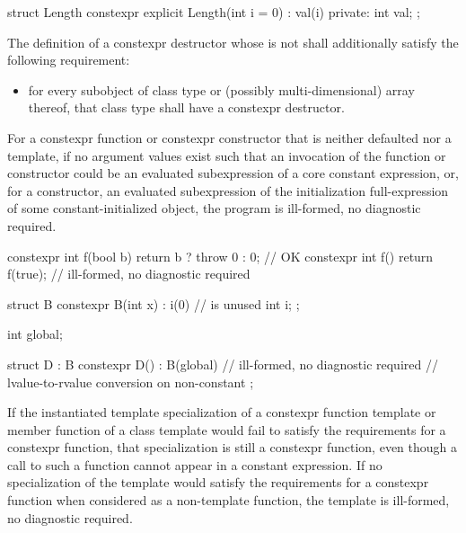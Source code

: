 \begin{example}
\begin{codeblock}
struct Length {
  constexpr explicit Length(int i = 0) : val(i) { }
private:
  int val;
};
\end{codeblock}
\end{example}

\pnum
The definition of a constexpr destructor
whose  is not 
shall additionally satisfy the following requirement:
\begin{itemize}
\item
  for every subobject of class type or
  (possibly multi-dimensional) array thereof,
  that class type shall have a constexpr destructor.
\end{itemize}

\pnum
For a constexpr function or constexpr constructor
that is neither defaulted nor a template,
if no argument values exist such that
an invocation of the function or constructor could be an evaluated subexpression of a core
constant expression, or,
for a constructor, an evaluated subexpression of
the initialization full-expression of some constant-initialized object,
the program is ill-formed, no diagnostic required.
\begin{example}
\begin{codeblock}
constexpr int f(bool b)
  { return b ? throw 0 : 0; }           // OK
constexpr int f() { return f(true); }   // ill-formed, no diagnostic required

struct B {
  constexpr B(int x) : i(0) { }         //  is unused
  int i;
};

int global;

struct D : B {
  constexpr D() : B(global) { }         // ill-formed, no diagnostic required
                                        // lvalue-to-rvalue conversion on non-constant 
};
\end{codeblock}
\end{example}

\pnum
If the instantiated template specialization of a constexpr function
template
or member function of a class template
would fail to satisfy the requirements for a constexpr
function,
that specialization is still a constexpr function,
even though a call to such a function cannot appear in a constant
expression. If no specialization of the template would satisfy the
requirements for a constexpr function
when considered as a non-template function, the template is
ill-formed, no diagnostic required.

